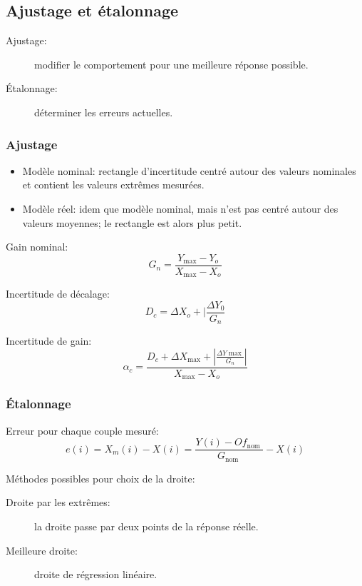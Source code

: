 \documentclass[10pt]{article} %
\begin{document}
\begin{multicols}{3}
\begin{flushleft}
		\subsection*{Ajustage et étalonnage}
			
			\begin{description}
				\item [Ajustage:] modifier le comportement pour une meilleure réponse possible.
				\item [Étalonnage:] déterminer les erreurs actuelles.
			\end{description}
			
			\subsubsection*{Ajustage}
					
					\begin{itemize}
						\item Modèle nominal: rectangle d'incertitude centré autour des valeurs nominales et contient les valeurs extrêmes mesurées.
						\item Modèle réel: idem que modèle nominal, mais n'est pas centré autour des valeurs moyennes; le rectangle est alors plus petit.
					\end{itemize}
					
					Gain nominal:
					\[G_{n}=\frac{Y_{\max }-Y_{o}}{X_{\max }-X_{o}}\]
					
					Incertitude de décalage:
					\[D_{c}=\Delta X_{o}+\mid \frac{\Delta Y_{0}}{G_{n}}\]
					
					Incertitude de gain:
					\[\alpha_{c}=\frac{D_{c}+\Delta X_{\max }+\left|\frac{\Delta Y \max }{G_{n}}\right|}{X_{\max }-X_{o}}\]
				
			\subsubsection*{Étalonnage}
				
				Erreur pour chaque couple mesuré:
				\[e(i)=X_{m}(i)-X(i)=\frac{Y(i)-O f_{\text {nom }}}{G_{\text {nom }}}-X(i)\]
				
				Méthodes possibles pour choix de la droite:
				\begin{description}
					\item [Droite par les extrêmes:] la droite passe par deux points de la réponse réelle.
					\item [Meilleure droite:] droite de régression linéaire.
				\end{description}
				

\end{flushleft}
\end{multicols}
\end{document}
